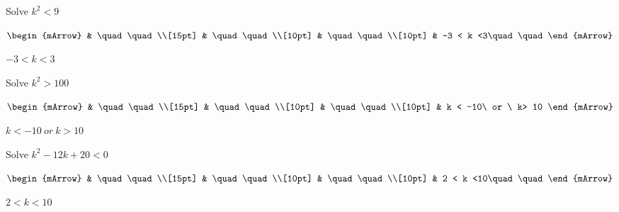 \clearpage
\begin{mtask}[resume]
   \task \begin{exercise} Solve $k^2 < 9$
           \begin{envSolution}
             $\begin{mArrow} 
			       & \quad \quad              \\[15pt]
                   & \quad \quad              \\[10pt]
		   		   & \quad \quad              \\[10pt]
				   & -3 < k <3\quad \quad 
              \end{mArrow}$
            \begin{shortsolution}  
			     $-3 < k < 3$
			\end{shortsolution}				 
           \end{envSolution}
         \end{exercise}
   \task \begin{exercise} Solve $k^2 > 100$
           \begin{envSolution}
             $\begin{mArrow} 
			       & \quad \quad              \\[15pt]
                   & \quad \quad              \\[10pt]
		   		   & \quad \quad              \\[10pt]
				   & k < -10\ or \ k> 10 
              \end{mArrow}$
            \begin{shortsolution}  
			     $k < -10\ or \ k> 10$
			\end{shortsolution}				 
           \end{envSolution}
         \end{exercise}
   \task \begin{exercise} Solve $k^2 - 12k + 20 < 0$
           \begin{envSolution}
             $\begin{mArrow} 
			       & \quad \quad              \\[15pt]
                   & \quad \quad              \\[10pt]
		   		   & \quad \quad              \\[10pt]
				   & 2 < k <10\quad \quad 
              \end{mArrow}$
            \begin{shortsolution}  
			     $2 < k <10$
			\end{shortsolution}				 

\end{envSolution}
\end{exercise}
\end{mtask}
